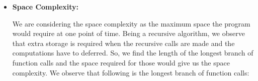 \documentclass[answers]{exam}
\renewcommand{\O}[1]{\mathcal{O}\left(#1\right)}
\begin{document}
\begin{questions}
{\begin{parts}
{\begin{solution}
\begin{itemize}
{                            \begin{equation*}
                                \begin{aligned}
                                    \frac{n!}{(n - k)!} &= n(n - 1)\dots(n - k + 1) = \O{n^k}\\
                                    \implies ^nC_k &= \frac{n!}{k!(n - k)!} \\
                                                   &= \O{\frac{n^k}{k!}} \\         
                                    \text{Now, } T(p, q) &= ^{p + q - 2}C_{q - 1} - 2\\
                                    &\text{We know that binomial coefficients are maximum in the middle}\\
                                    T(p, q) &= \O{(2p - 2)C_{p - 1}} \\
                                            &= \O{\frac{(2p - 2)^{p - 1}}{(p - 1)!}}\\
                                            &= \O{2^{p - 1} \frac{(p - 1)^{p - 1}}{(p - 1)!}}\\
                                            &= \O{2^p}
                                \end{aligned}
                            \end{equation*}
                            So, the time complexity is \(\O{2^p}\) in the worst case.
                        }
                    
                    \newpage

                    \item {
                        \textbf{Space Complexity: }

                        We are considering the space complexity as the maximum space the program would require at one point of time.
                        Being a recursive algorithm, we observe that extra storage is required when the recursive calls are made and
                        the computations have to deferred. So, we find the length of the longest branch of function calls and the space
                        required for those would give us the space complexity. We observe that following is the longest branch of function
                        calls:

}
\end{itemize}
\end{solution}}
\end{parts}}
\end{questions}
\end{document}
